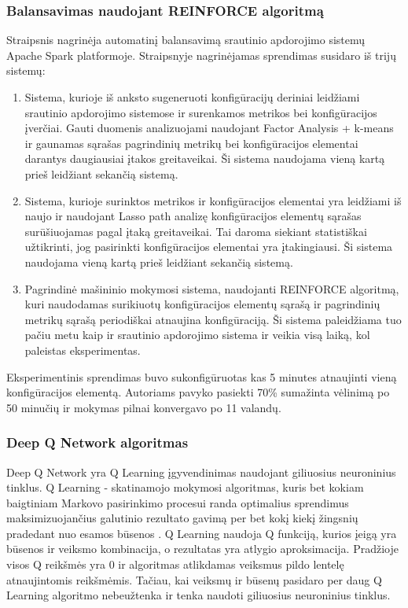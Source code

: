 \documentclass{VUMIFPSbakalaurinis}
\begin{document}
\subsubsection{Balansavimas naudojant REINFORCE algoritmą}
Straipsnis \cite{vaquero2018autotuning} nagrinėja automatinį balansavimą srautinio apdorojimo sistemų Apache Spark platformoje. Straipsnyje nagrinėjamas sprendimas susidaro iš trijų sistemų:
\begin{enumerate}
    \item Sistema, kurioje iš anksto sugeneruoti konfigūracijų deriniai leidžiami srautinio apdorojimo sistemose ir surenkamos metrikos bei konfigūracijos įverčiai. Gauti duomenis analizuojami naudojant Factor Analysis + k-means ir gaunamas sąrašas pagrindinių metrikų bei konfigūracijos elementai darantys daugiausiai įtakos greitaveikai. Ši sistema naudojama vieną kartą prieš leidžiant sekančią sistemą. 
    \item Sistema, kurioje surinktos metrikos ir konfigūracijos elementai yra leidžiami iš naujo ir naudojant Lasso path analizę konfigūracijos elementų sąrašas surūšiuojamas pagal įtaką greitaveikai. Tai daroma siekiant statistiškai užtikrinti, jog pasirinkti konfigūracijos elementai yra įtakingiausi. Ši sistema naudojama vieną kartą prieš leidžiant sekančią sistemą.
    \item Pagrindinė mašininio mokymosi sistema, naudojanti REINFORCE algoritmą, kuri naudodamas surikiuotų konfigūracijos elementų sąrašą ir pagrindinių metrikų sąrašą periodiškai atnaujina konfigūraciją. Ši sistema paleidžiama tuo pačiu metu kaip ir srautinio apdorojimo sistema ir veikia visą laiką, kol paleistas eksperimentas.
\end{enumerate}  
Eksperimentinis sprendimas buvo sukonfigūruotas kas 5 minutes atnaujinti vieną konfigūracijos elementą. Autoriams pavyko pasiekti 70\% sumažinta vėlinimą po 50 minučių ir mokymas pilnai konvergavo po 11 valandų.

\subsubsection{Deep Q Network algoritmas}
Deep Q Network yra Q Learning įgyvendinimas naudojant giliuosius neuroninius tinklus. Q Learning - skatinamojo mokymosi algoritmas, kuris bet kokiam baigtiniam Markovo pasirinkimo procesui randa optimalius sprendimus maksimizuojančius galutinio rezultato gavimą per bet kokį kiekį žingsnių pradedant nuo esamos būsenos \cite{melo2001convergence}. 
Q Learning naudoja Q funkciją, kurios įeigą yra būsenos ir veiksmo kombinacija, o rezultatas yra atlygio aproksimacija. Pradžioje visos Q reikšmės yra 0 ir algoritmas atlikdamas veiksmus pildo lentelę atnaujintomis reikšmėmis. Tačiau, kai veiksmų ir būsenų pasidaro per daug Q Learning algoritmo nebeužtenka ir tenka naudoti giliuosius neuroninius tinklus.  
\end{document}
